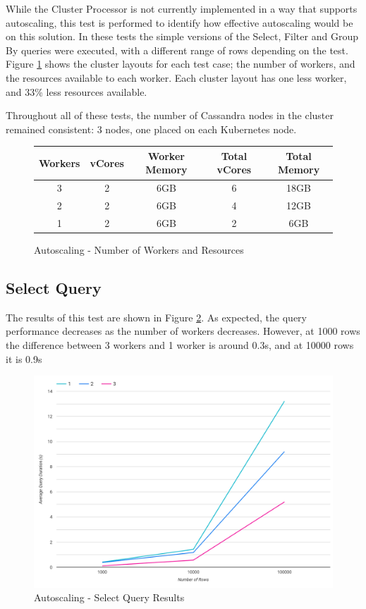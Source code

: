 While the Cluster Processor is not currently implemented in a way that supports autoscaling, this test is performed to identify how effective autoscaling would be on this solution. In these tests the simple versions of the Select, Filter and Group By queries were executed, with a different range of rows depending on the test. Figure \ref{fig:autoscale-test-workers} shows the cluster layouts for each test case; the number of workers, and the resources available to each worker. Each cluster layout has one less worker, and 33\% less resources available.

Throughout all of these tests, the number of Cassandra nodes in the cluster remained consistent: 3 nodes, one placed on each Kubernetes node.

\begin{figure}[h]
	\centering
	\begin{tabular}{| c | c | c | c | c |}
		\hline
		\textbf{Workers} & \textbf{vCores} & \textbf{Worker Memory} & \textbf{Total vCores} & \textbf{Total Memory} \\ \hline
		3 & 2 & 6GB & 6 & 18GB \\ \hline
		2 & 2 & 6GB & 4 & 12GB \\ \hline
		1 & 2 & 6GB & 2 & 6GB \\ \hline
	\end{tabular}
	\caption{Autoscaling - Number of Workers and Resources}
	\label{fig:autoscale-test-workers}
\end{figure}

\subsection{Select Query}
The results of this test are shown in Figure \ref{fig:select-simple-autoscale-test}. As expected, the query performance decreases as the number of workers decreases. However, at 1000 rows the difference between 3 workers and 1 worker is around 0.3s, and at 10000 rows it is 0.9s

\begin{figure}[h]
	\centering
	\includegraphics[width=0.8\linewidth]{chapters/diagrams/testing/select-simple-autoscale-test}
	\caption{Autoscaling - Select Query Results}
	\label{fig:select-simple-autoscale-test}
\end{figure}

